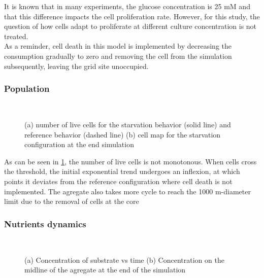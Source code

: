 \documentclass[11pt,a4paper]{article}
\begin{document}
It is known that in many experiments, the glucose concentration is 25 mM and that this difference impacts the cell proliferation rate. However, for this study, the question of how cells adapt to proliferate at different culture concentration is not treated.%
\\

As a reminder, cell death in this model is implemented by decreasing the consumption gradually to zero and removing the cell from the simulation subsequently, leaving the grid site unoccupied.\\

\subsubsection{Population}
\begin{figure}[h]
\begin{subfigure}{0.5\textwidth}
	\centering
	
	\caption{ \label{starv_numbers}}
\end{subfigure}
~~
\begin{subfigure}{0.5\textwidth}
	\centering
	
	\caption{\label{starv_Grid}}
\end{subfigure}
\caption{(a) number of live cells for the starvation behavior (solid line) and reference behavior (dashed line) (b) cell map for the starvation configuration at the end simulation \label{starv_numbers_Grid}}
\end{figure}

As can be seen in \ref{starv_numbers}, the number of live cells is not monotonous. When cells cross the threshold, the initial exponential trend undergoes an inflexion, at which points it deviates from the reference configuration where cell death is not implemented. The agregate also takes more cycle to reach the 1000 \textmu m-diameter limit due to the removal of cells at the core\\

\newpage
\subsubsection{Nutrients dynamics}
\begin{figure}[h]
\begin{subfigure}{0.5\textwidth}
	\centering
	
	\caption{ \label{starv_S_center}}
\end{subfigure}
~~
\begin{subfigure}{0.5\textwidth}
	\centering
	
	\caption{\label{S_starv_midline}}
\end{subfigure}
\caption{(a) Concentration of substrate vs time (b) Concentration on the midline of the agregate at the end of the simulation \label{tarv_SO}}
\end{figure}
\end{document}
